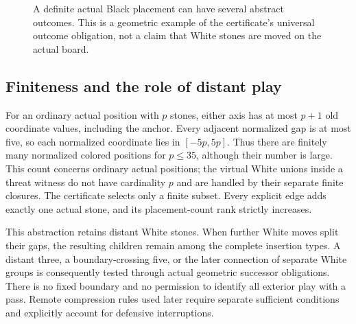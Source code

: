 \documentclass[11pt]{article}
\theoremstyle{definition}
\theoremstyle{remark}
\begin{document}
\begin{figure}[ht]
\centering
{}
\caption{A definite actual Black placement can have several abstract outcomes.
This is a geometric example of the certificate's universal outcome
obligation, not a claim that White stones are moved on the actual board.}
\label{fig:black}
\end{figure}

\subsection{Finiteness and the role of distant play}
For an ordinary actual position with $p$ stones, either axis has at most
$p+1$ old coordinate values,
including the anchor. Every adjacent normalized gap is at most five, so
each normalized coordinate lies in $[-5p,5p]$. Thus there are finitely many
normalized colored positions for $p\leq35$, although their number is large. This count concerns ordinary actual
positions; the virtual White unions inside a threat witness do not have
cardinality $p$ and are handled by their separate finite closures.
The certificate selects only a finite subset. Every explicit edge adds
exactly one actual stone, and its placement-count rank strictly increases.

This abstraction retains distant White stones. When further White moves
split their gaps, the resulting children remain among the complete
insertion types. A distant three, a boundary-crossing five, or the later
connection of separate White groups is consequently tested through actual
geometric successor obligations. There is no fixed boundary and no
permission to identify all exterior play with a pass. Remote compression
rules used later require separate sufficient conditions and explicitly
account for defensive interruptions.
\end{document}
